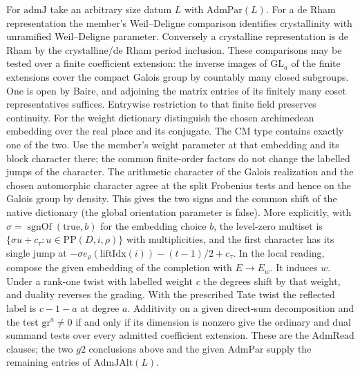 For $\mathrm{admJ}$ take an arbitrary size datum $L$ with
$\mathrm{AdmPar}(L)$. For a de Rham representation the member's
Weil--Deligne comparison identifies crystallinity with unramified
Weil--Deligne parameter. Conversely a crystalline representation
is de Rham by the crystalline/de Rham period inclusion. These
comparisons may be tested over a finite coefficient extension:
the inverse images of $\mathrm{GL}_a$ of the finite extensions
cover the compact Galois group by countably many closed subgroups.
One is open by Baire, and adjoining the matrix entries of its
finitely many coset representatives suffices. Entrywise
restriction to that finite field preserves continuity.
For the weight dictionary distinguish the chosen archimedean
embedding over the real place and its conjugate. The CM type
contains exactly one of the two. Use the member's weight
parameter at that embedding and its block character there; the
common finite-order factors do not change the labelled jumps of
the character. The arithmetic character of the Galois realization
and the chosen automorphic character agree at the split
Frobenius tests and hence on the Galois group by density.
This gives the two signs and the common shift of the native
dictionary (the global orientation parameter is false). More
explicitly, with $\sigma=\operatorname{sgnOf}(\mathrm{true},b)$
for the embedding choice $b$, the level-zero multiset is
$\{\sigma u+c_\tau:u\in \mathrm{PP}(D,i,\rho)\}$ with
multiplicities, and the first character has its single jump at
$-\sigma e_\rho(\mathrm{liftIdx}(i))-(t-1)/2+c_\tau$.
In the local reading, compose the given embedding of the
completion with $E\to E_w$. It induces $w$. Under a rank-one
twist with labelled weight $c$ the degrees shift by that
weight, and duality reverses the grading. With the prescribed
Tate twist the reflected label is $c-1-a$ at degree $a$.
Additivity on a given direct-sum decomposition and the test
$\mathrm{gr}^a\ne0$ if and only if its dimension is nonzero
give the ordinary and dual summand tests over every admitted
coefficient extension. These are the $\mathrm{AdmRead}$ clauses;
the two $g2$ conclusions above and the given $\mathrm{AdmPar}$
supply the remaining entries of $\mathrm{AdmJAlt}(L)$.

